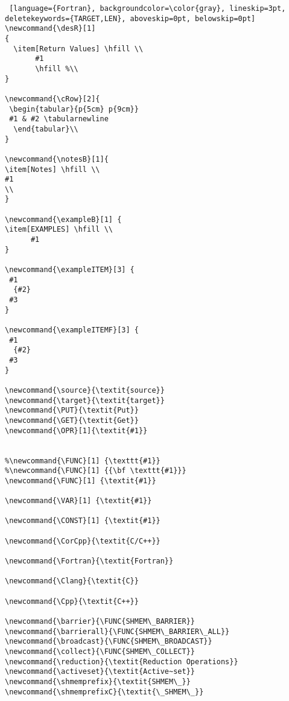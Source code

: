 {\begin{lstlisting} [language={Fortran}, backgroundcolor=\color{gray}, lineskip=3pt, deletekeywords={TARGET,LEN}, aboveskip=0pt, belowskip=0pt]
\newcommand{\desR}[1]
{
  \item[Return Values] \hfill \\
       #1 
       \hfill %\\
}

\newcommand{\cRow}[2]{
 \begin{tabular}{p{5cm} p{9cm}}
 #1 & #2 \tabularnewline
  \end{tabular}\\
}

\newcommand{\notesB}[1]{
\item[Notes] \hfill \\
#1
\\
}

\newcommand{\exampleB}[1] {
\item[EXAMPLES] \hfill \\
      #1
}

\newcommand{\exampleITEM}[3] {
 #1
  {#2}	
 #3  
}

\newcommand{\exampleITEMF}[3] {
 #1
  {#2}
 #3 
}

\newcommand{\source}{\textit{source}}
\newcommand{\target}{\textit{target}}
\newcommand{\PUT}{\textit{Put}}
\newcommand{\GET}{\textit{Get}}
\newcommand{\OPR}[1]{\textit{#1}}


%\newcommand{\FUNC}[1] {\texttt{#1}}
%\newcommand{\FUNC}[1] {{\bf \texttt{#1}}}
\newcommand{\FUNC}[1] {\textit{#1}}

\newcommand{\VAR}[1] {\textit{#1}}

\newcommand{\CONST}[1] {\textit{#1}}

\newcommand{\CorCpp}{\textit{C/C++}}

\newcommand{\Fortran}{\textit{Fortran}}

\newcommand{\Clang}{\textit{C}}

\newcommand{\Cpp}{\textit{C++}}

\newcommand{\barrier}{\FUNC{SHMEM\_BARRIER}}
\newcommand{\barrierall}{\FUNC{SHMEM\_BARRIER\_ALL}}
\newcommand{\broadcast}{\FUNC{SHMEM\_BROADCAST}}
\newcommand{\collect}{\FUNC{SHMEM\_COLLECT}}
\newcommand{\reduction}{\textit{Reduction Operations}}
\newcommand{\activeset}{\textit{Active~set}}
\newcommand{\shmemprefix}{\textit{SHMEM\_}}
\newcommand{\shmemprefixC}{\textit{\_SHMEM\_}}


\end{lstlisting}}
